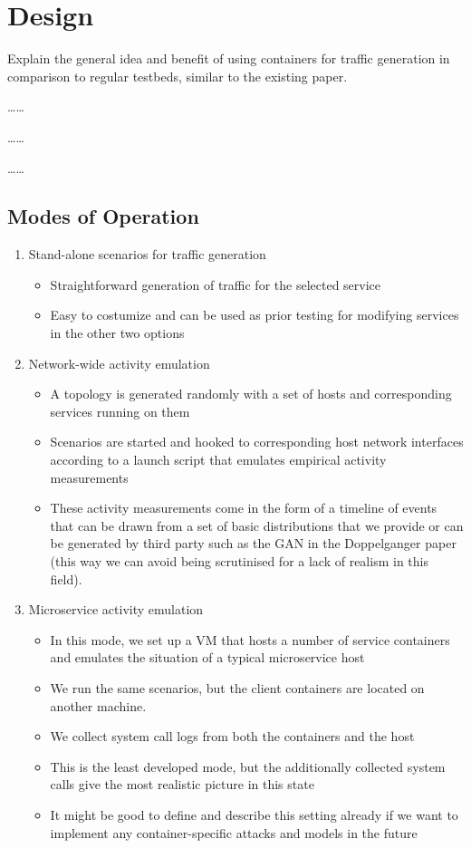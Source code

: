 \documentclass[sigconf]{acmart}
\begin{document}
\section{Design}\label{Sec:Design}

Explain the general idea and benefit of using containers for traffic generation in comparison to regular testbeds, similar to the existing paper.

\dots \dots

\dots \dots

\dots \dots
\subsection{Modes of Operation}

\begin{enumerate}
\item Stand-alone scenarios for traffic generation
\begin{itemize}
\item Straightforward generation of traffic for the selected service
\item Easy to costumize and can be used as prior testing for modifying services in the other two options
\end{itemize}
\item Network-wide activity emulation
\begin{itemize}
\item A topology is generated randomly with a set of hosts and corresponding services running on them
\item Scenarios are started and hooked to corresponding host network interfaces according to a launch script that emulates empirical activity measurements
\item These activity measurements come in the form of a timeline of events that can be drawn from a set of basic distributions that we provide or can be generated by third party such as the GAN in the Doppelganger paper (this way we can avoid being scrutinised for a lack of realism in this field).
\end{itemize}


\item Microservice activity emulation
\begin{itemize}
\item In this mode, we set up a VM that hosts a number of service containers and emulates the situation of a typical microservice host
\item We run the same scenarios, but the client containers are located on another machine. 
\item We collect system call logs from both the containers and the host
\item This is the least developed mode, but the additionally collected system calls give the most realistic picture in this state
\item It might be good to define and describe this setting already if we want to implement any container-specific attacks and models in the future
\end{itemize}

\end{enumerate}
\end{document}
